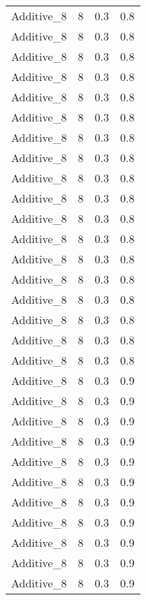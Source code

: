\documentclass{article}
\begin{document}
\begin{longtable}[H]{lrrr}
 Additive\_8 &       8 &   0.3 &            0.8 \\
 Additive\_8 &       8 &   0.3 &            0.8 \\
 Additive\_8 &       8 &   0.3 &            0.8 \\
 Additive\_8 &       8 &   0.3 &            0.8 \\
 Additive\_8 &       8 &   0.3 &            0.8 \\
 Additive\_8 &       8 &   0.3 &            0.8 \\
 Additive\_8 &       8 &   0.3 &            0.8 \\
 Additive\_8 &       8 &   0.3 &            0.8 \\
 Additive\_8 &       8 &   0.3 &            0.8 \\
 Additive\_8 &       8 &   0.3 &            0.8 \\
 Additive\_8 &       8 &   0.3 &            0.8 \\
 Additive\_8 &       8 &   0.3 &            0.8 \\
 Additive\_8 &       8 &   0.3 &            0.8 \\
 Additive\_8 &       8 &   0.3 &            0.8 \\
 Additive\_8 &       8 &   0.3 &            0.8 \\
 Additive\_8 &       8 &   0.3 &            0.8 \\
 Additive\_8 &       8 &   0.3 &            0.8 \\
 Additive\_8 &       8 &   0.3 &            0.8 \\
 Additive\_8 &       8 &   0.3 &            0.9 \\
 Additive\_8 &       8 &   0.3 &            0.9 \\
 Additive\_8 &       8 &   0.3 &            0.9 \\
 Additive\_8 &       8 &   0.3 &            0.9 \\
 Additive\_8 &       8 &   0.3 &            0.9 \\
 Additive\_8 &       8 &   0.3 &            0.9 \\
 Additive\_8 &       8 &   0.3 &            0.9 \\
 Additive\_8 &       8 &   0.3 &            0.9 \\
 Additive\_8 &       8 &   0.3 &            0.9 \\
 Additive\_8 &       8 &   0.3 &            0.9 \\
 Additive\_8 &       8 &   0.3 &            0.9 \\

\end{longtable}
\end{document}
